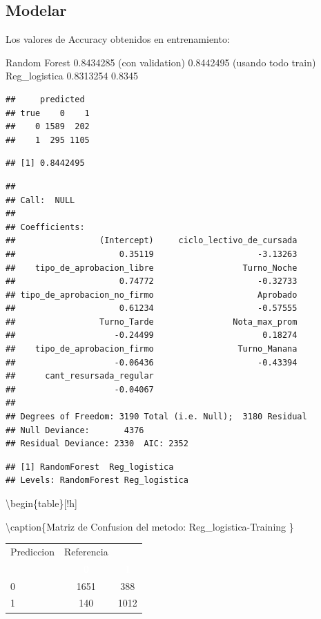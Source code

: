 \documentclass[]{article}
\begin{document}
\hypertarget{modelar-8}{%
\subsection{Modelar}\label{modelar-8}}

Los valores de Accuracy obtenidos en entrenamiento:

Random Forest 0.8434285 (con validation) 0.8442495 (usando todo train)
Reg\_logistica 0.8313254 0.8345

\begin{lstlisting}
##     predicted
## true    0    1
##    0 1589  202
##    1  295 1105
\end{lstlisting}

\begin{lstlisting}
## [1] 0.8442495
\end{lstlisting}

\begin{lstlisting}
## 
## Call:  NULL
## 
## Coefficients:
##                 (Intercept)     ciclo_lectivo_de_cursada  
##                     0.35119                     -3.13263  
##    tipo_de_aprobacion_libre                  Turno_Noche  
##                     0.74772                     -0.32733  
## tipo_de_aprobacion_no_firmo                     Aprobado  
##                     0.61234                     -0.57555  
##                 Turno_Tarde                Nota_max_prom  
##                    -0.24499                      0.18274  
##    tipo_de_aprobacion_firmo                 Turno_Manana  
##                    -0.06436                     -0.43394  
##      cant_resursada_regular  
##                    -0.04067  
## 
## Degrees of Freedom: 3190 Total (i.e. Null);  3180 Residual
## Null Deviance:       4376 
## Residual Deviance: 2330  AIC: 2352
\end{lstlisting}

\begin{lstlisting}
## [1] RandomForest  Reg_logistica
## Levels: RandomForest Reg_logistica
\end{lstlisting}

\textbackslash{}begin\{table\}{[}!h{]}

\textbackslash{}caption\{\label{tab:MatrizConf_Reg_logistica-Training}Matriz
de Confusion del metodo: Reg\_logistica-Training \} \centering

\begin{tabular}[t]{lcc}
\toprule
\multicolumn{1}{c}{Prediccion} & \multicolumn{1}{c}{Referencia} & \multicolumn{1}{c}{ } \\
\cmidrule(l{3pt}r{3pt}){1-1} \cmidrule(l{3pt}r{3pt}){2-2}
\rowcolor{black}  \multicolumn{1}{c}{\textcolor{white}{\textbf{ }}} & \multicolumn{1}{c}{\textcolor{white}{\textbf{0}}} & \multicolumn{1}{c}{\textcolor{white}{\textbf{1}}}\\
\midrule
\rowcolor{gray!6}  0 & 1651 & 388\\
1 & 140 & 1012\\
\bottomrule
\end{tabular}
\end{document}
